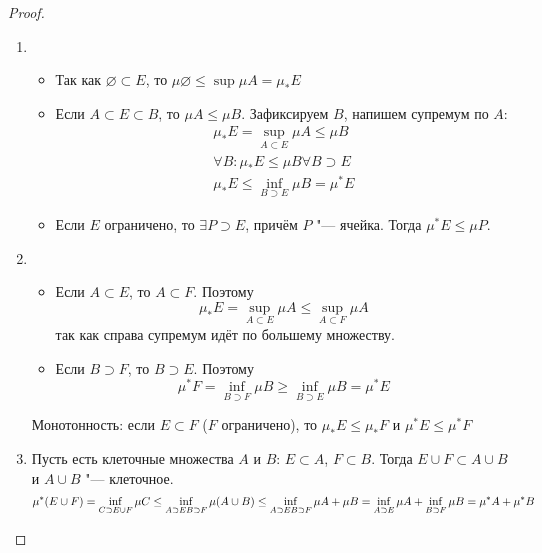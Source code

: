 \begin{proof}
	\begin{enumerate}
	\item
		\begin{itemize}
		\item
			Так как $\varnothing \subset E$, то $\mu \varnothing \le \sup \mu A = \mu_* E$
		\item
			Если $A \subset E \subset B$, то $\mu A \le \mu B$.
			Зафиксируем $B$, напишем супремум по $A$:
			\begin{gather*}
				\mu_* E = \sup_{A \subset E} \mu A \le \mu B \\
				\forall B \colon \mu_* E \le \mu B \forall B \supset E \\
				\mu_* E \le \inf_{B \supset E} \mu B = \mu^* E
			\end{gather*}
		\item
			Если $E$ ограничено, то $\exists P \supset E$, причём $P$ "--- ячейка.
			Тогда $\mu^* E \le \mu P$.
		\end{itemize}
	\item
		\begin{itemize}
		\item
			Если $A \subset E$, то $A \subset F$.
			Поэтому
			\[\mu_*E = \sup_{A \subset E} \mu A \le \sup_{A \subset F} \mu A\]
			так как справа супремум идёт по большему множеству.
		\item
			Если $B \supset F$, то $B \supset E$.
			Поэтому
			\[\mu^*F = \inf_{B \supset F} \mu B \ge \inf_{B \supset E} \mu B = \mu^* E\]
		\end{itemize}
		Монотонность: если $E \subset F$ ($F$ ограничено), то
		$\mu_* E \le \mu_* F$ и $\mu^* E \le \mu^* F$
	\item
		Пусть есть клеточные множества $A$ и $B$: $E \subset A$, $F \subset B$.
		Тогда $E \cup F \subset A \cup B$ и $A \cup B$ "--- клеточное.
		\[
		\mu^* (E \cup F)
		= \inf_{C \supset E \cup F} \mu C
		\le \inf_{A \supset E\\ B \supset F} \mu(A \cup B)
		\le \inf_{A \supset E\\ B \supset F} \mu A + \mu B
		= \inf_{A \supset E} \mu A + \inf_{B \supset F} \mu B
		= \mu^* A + \mu^* B
		\]
	\end{enumerate}
\end{proof}

